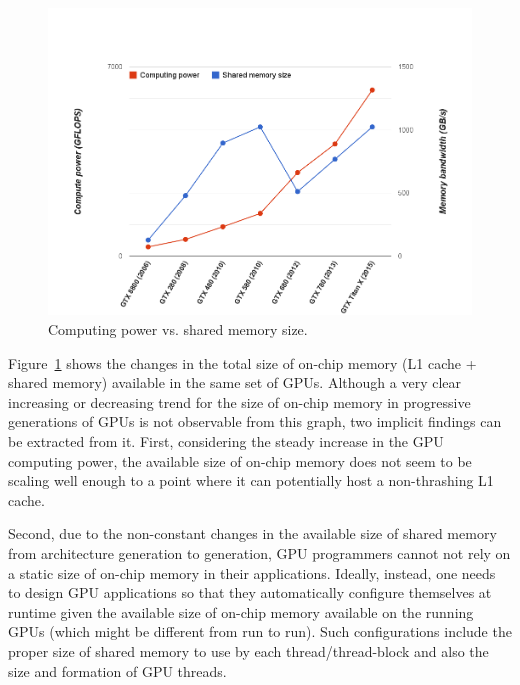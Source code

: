 \begin{figure}[t]
\includegraphics[scale=0.5]{computevsshared.png}
\caption{Computing power vs. shared memory size.}
\label{fig:computevsshared}
\end{figure}

Figure~\ref{fig:computevsshared} shows the changes in the total size of on-chip
memory (L1 cache + shared memory) available in the same set of GPUs. Although a
very clear increasing or decreasing trend for the size of on-chip memory in
progressive generations of GPUs is not observable from this graph, two implicit
findings can be extracted from it. First, considering the steady increase in
the GPU computing power, the available size of on-chip memory does not seem to
be scaling well enough to a point where it can potentially host a non-thrashing
L1 cache.

Second, due to the non-constant changes in the available size of shared memory
from architecture generation to generation, GPU programmers cannot not rely on
a static size of on-chip memory in their applications. Ideally, instead, one
needs to design GPU applications so that they automatically configure
themselves at runtime given the available size of on-chip memory available on
the running GPUs (which might be different from run to run). Such
configurations include the proper size of shared memory to use by each
thread/thread-block and also the size and formation of GPU threads.

